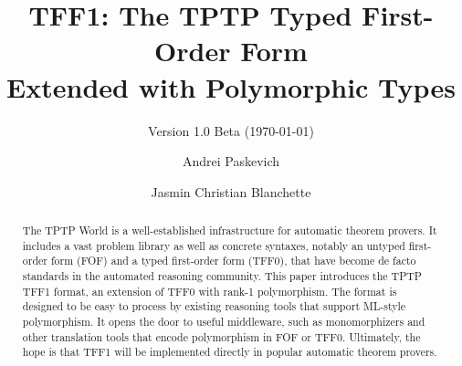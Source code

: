 \documentclass[a4paper]{llncs}
\begin{document}
\title{
TFF1: The TPTP Typed First-Order Form \\ Extended with %
Polymorphic Types}
\subtitle{Version 1.0 Beta (\today)}

\author{
Andrei Paskevich \and Jasmin Christian Blanchette
}


\maketitle

\begin{abstract}
The TPTP World is a well-established infrastructure for automatic theorem
provers. It includes a vast problem library as well as concrete syntaxes,
notably an untyped first-order form (FOF) and a typed first-order form (TFF0),
that have become de facto standards in the automated reasoning
community. This paper introduces the TPTP TFF1 format, an extension of TFF0 with
rank-1 polymorphism. The format is designed to be easy to process by existing
reasoning tools that support ML-style polymorphism. It opens the door to useful
middleware, such as monomorphizers and other translation tools that encode
polymorphism in FOF or TFF0. Ultimately, the hope is that TFF1 will be
implemented directly in popular automatic theorem provers.
\end{abstract}












\end{document}
